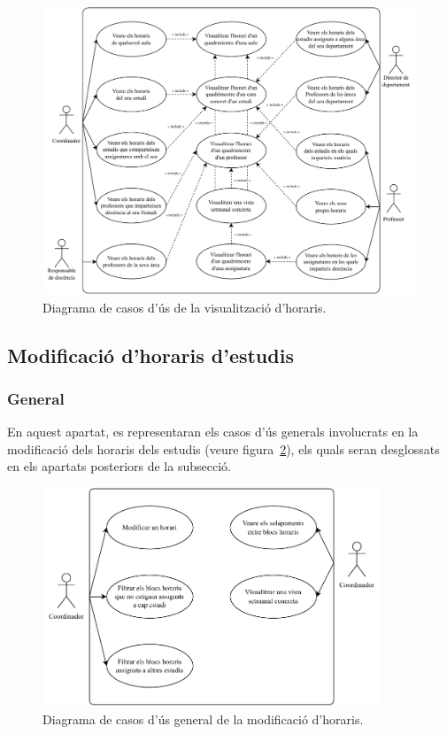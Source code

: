 \documentclass[a4paper,12pt]{ThesisStyle}
\begin{document}
\begin{figure}[H]
  \centering
  \includegraphics[width=\textwidth]{assets/use_cases/horaris/visualitzar.pdf}
  \caption{\label{img:casos_us_veure_horaris}Diagrama de casos d'ús de la visualització d'horaris.}
\end{figure}

\subsection{Modificació d'horaris d'estudis}
\label{subsec:casos_us_modif_horaris}

\subsubsection{General}

En aquest apartat, es representaran els casos d'ús generals involucrats en la modificació dels horaris dels estudis (veure figura~\ref{img:casos_us_modif_horaris_general}), els quals seran desglossats en els apartats posteriors de la subsecció.

\begin{figure}[H]
  \centering
  \includegraphics[width=0.9\textwidth]{assets/use_cases/horaris/modificar/general.pdf}
  \caption{\label{img:casos_us_modif_horaris_general}Diagrama de casos d'ús general de la modificació d'horaris.}
\end{figure}
\end{document}
